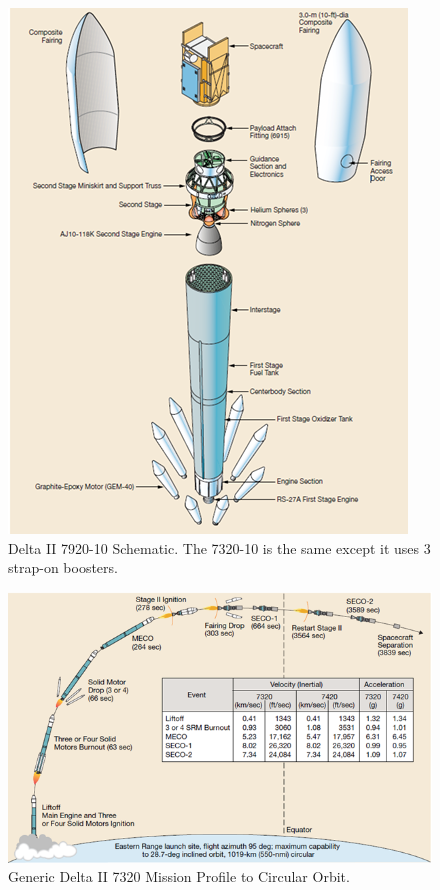 \documentclass[paper=letter, fontsize=11pt]{scrartcl} %
\numberwithin{equation}{section} %
\numberwithin{figure}{section} %
\numberwithin{table}{section} %
\begin{document}
\begin{figure}[H]
    \centering
    \includegraphics[width=.75\textwidth]{12-1.png}
    \caption{Delta II 7920-10 Schematic. The 7320-10 is the same except it uses 3 strap-on boosters.~\cite{ref12_13}}
    \label{L1}
\end{figure}

\begin{figure}[H]
    \centering
    \includegraphics[width=.75\textwidth]{12-2.png}
    \caption{Generic Delta II 7320 Mission Profile to Circular Orbit.}
    \label{L2}
\end{figure}
\end{document}
